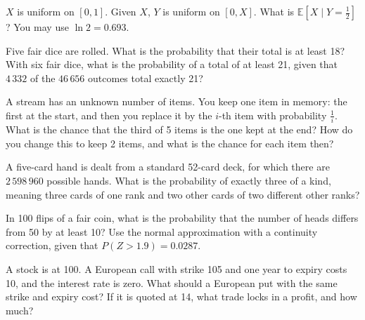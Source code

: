 
\begin{question}\label{iq:iv1:timed-test-10:7}
$X$ is uniform on $[0, 1]$. Given $X$, $Y$ is uniform on $[0, X]$. What is $\mathbb{E}[X \mid Y = \frac12]$? You may use $\ln 2 = 0.693$.
\end{question}

\begin{question}\label{iq:iv1:timed-test-10:8}
Five fair dice are rolled. What is the probability that their total is at least 18? With six fair dice, what is the probability of a total of at least 21, given that $4\,332$ of the $46\,656$ outcomes total exactly 21?
\end{question}

\begin{question}\label{iq:iv1:timed-test-10:9}
A stream has an unknown number of items. You keep one item in memory: the first at the start, and then you replace it by the $i$-th item with probability $\frac1i$. What is the chance that the third of 5 items is the one kept at the end? How do you change this to keep 2 items, and what is the chance for each item then?
\end{question}

\begin{question}\label{iq:iv1:timed-test-10:10}
A five-card hand is dealt from a standard 52-card deck, for which there are $2\,598\,960$ possible hands. What is the probability of exactly three of a kind, meaning three cards of one rank and two other cards of two different other ranks?
\end{question}

\begin{question}\label{iq:iv1:timed-test-10:11}
In 100 flips of a fair coin, what is the probability that the number of heads differs from 50 by at least 10? Use the normal approximation with a continuity correction, given that $P(Z > 1.9) = 0.0287$.
\end{question}

\begin{question}\label{iq:iv1:timed-test-10:12}
A stock is at 100. A European call with strike 105 and one year to expiry costs 10, and the interest rate is zero. What should a European put with the same strike and expiry cost? If it is quoted at 14, what trade locks in a profit, and how much?
\end{question}
